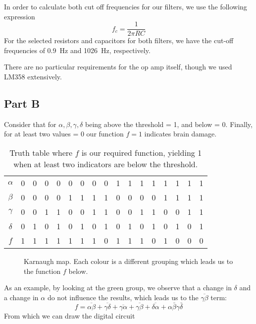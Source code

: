 In order to calculate both cut off frequencies for our filters, we use the following expression
\begin{equation}
    f_c = \frac{1}{2\pi RC}
\end{equation}
For the selected resistors and capacitors for both filters, we have the cut-off frequencies of \SI{0.9}{Hz} and \SI{1026}{Hz}, respectively.

There are no particular requirements for the op amp itself, though we used LM358 extensively.

\subsection*{Part B}

Consider that for $\alpha, \beta, \gamma, \delta$ being above the threshold = 1, and below = 0. Finally, for at least two values = 0 our function $f = 1$ indicates brain damage.


\begin{table}[h] \centering
    \begin{tabular}{c|cccccccccccccccc}
        $\alpha$ &0&0&0&0&0&0&0&0&1&1&1&1&1&1&1&1 \\
        $\beta $ &0&0&0&0&1&1&1&1&0&0&0&0&1&1&1&1 \\
        $\gamma$ &0&0&1&1&0&0&1&1&0&0&1&1&0&0&1&1 \\
        $\delta$ &0&1&0&1&0&1&0&1&0&1&0&1&0&1&0&1 \\
        $f$      &1&1&1&1&1&1&1&0&1&1&1&0&1&0&0&0
    \end{tabular}
    \caption{Truth table where $f$ is our required function, yielding 1 when at least two indicators are below the threshold.}
 \end{table}

\begin{figure}[h] \centering
\begin{Karnaugh}
\end{Karnaugh}
\caption{Karnaugh map. Each colour is a different grouping which leads us to the function $f$ below.}
\end{figure}
As an example, by looking at the green group, we observe that a change in $\delta$ and a change in $\alpha$ do not influence the results, which leads us to the $\overline{\gamma\beta} $ term: 
\begin{equation}
    f = \overline{\alpha\beta} + \overline{\gamma\delta} + \overline{\gamma\alpha} +\overline{\gamma\beta} + \overline{\delta\alpha} + \alpha\bar{\beta}\gamma\bar{\delta}
\end{equation}
From which we can draw the digital circuit

